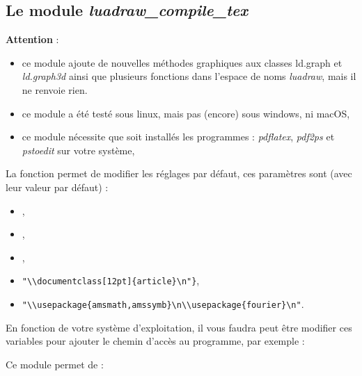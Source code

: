 \subsection{Le module \emph{luadraw\_compile\_tex}}

\textbf{Attention} : 
\begin{itemize}
    \item ce module ajoute de nouvelles méthodes graphiques aux classes {ld.graph} et \emph{ld.graph3d} ainsi que plusieurs fonctions dans l'espace de noms \emph{luadraw}, mais il ne renvoie rien.
    \item ce module a été testé sous linux, mais pas (encore) sous windows, ni macOS,
    \item ce module nécessite que soit installés les programmes : \emph{pdflatex}, \emph{pdf2ps} et \emph{pstoedit} sur votre système,
\end{itemize}

La fonction  permet de modifier les réglages par défaut, ces paramètres sont (avec leur valeur par défaut) :
\begin{itemize}
    \item {},
    \item {},
    \item {},
    \item {}\verb|"\\documentclass[12pt]{article}\n"}|,
    \item {}\verb|"\\usepackage{amsmath,amssymb}\n\\usepackage{fourier}\n"|.
\end{itemize}

En fonction de votre système d'exploitation, il vous faudra peut être modifier ces variables pour ajouter le chemin d'accès au programme, par exemple : 


Ce module permet de :

